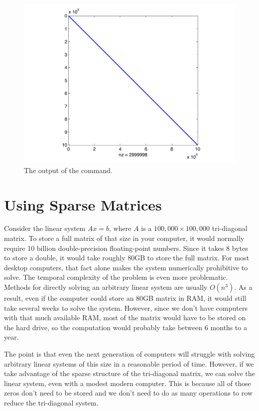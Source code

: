 \begin{figure}[h!]
\begin{center}
\includegraphics[scale = .5]{./FiguresMAT/spy}
\end{center}
\caption{The output of the  command.}
\end{figure}

\section*{Using Sparse Matrices}

Consider the linear system $A x = b$, where $A$ is a
 $100,\!000\times 100,\!000$ tri-diagonal matrix.  To store a full
matrix of that size in your computer, it would normally require 10
billion double-precision floating-point numbers.  Since it takes 8
bytes to store a double, it would take roughly 80GB to store the
full matrix.  For most desktop computers, that fact alone makes the
system numerically prohibitive to solve. The temporal complexity of the problem is even more problematic. Methods for directly solving an arbitrary linear system are usually $O(n^3)$.  As
a result, even if the computer could store an 80GB matrix in RAM, it
would still take several weeks to solve the system.  However, since
we don't have computers with that much available RAM, most of the
matrix would have to be stored on the hard drive, so the computation
would probably take between $6$ months to a year.

The point is that even the next generation of computers will
struggle with solving arbitrary linear systems of this size in a
reasonable period of time.  However, if we take advantage of the
sparse structure of the tri-diagonal matrix, we can solve the linear
system, even with a modest modern computer.  This is because all of
those zeros don't need to be stored and we don't need to do as many
operations to row reduce the tri-diagonal system.

